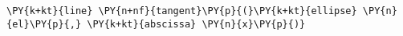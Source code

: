 \begin{Verbatim}[commandchars=\\\{\}]
    \PY{k+kt}{line} \PY{n+nf}{tangent}\PY{p}{(}\PY{k+kt}{ellipse} \PY{n}{el}\PY{p}{,} \PY{k+kt}{abscissa} \PY{n}{x}\PY{p}{)}
\end{Verbatim}
